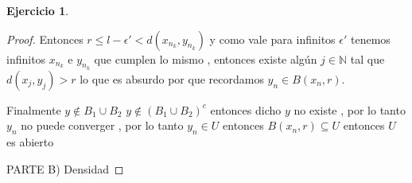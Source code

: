 \documentclass[12pt]{article}
\newcommand{\N}{\mathbb{N}}
\theoremstyle{definition}
\newtheorem{ej}{Ejercicio}
\begin{document}
\begin{ej}
\begin{proof}
	  Entonces $r \leq l - \epsilon ' < d(x_{n_k},y_{n_k})$ y como vale para infinitos $\epsilon '$ tenemos infinitos $x_{n_k}$ e $y_{n_k}$ que cumplen lo mismo , entonces existe algún $j \in \N$ tal que $d(x_j,y_j) > r$ lo que es absurdo por que recordamos $y_n \in B(x_n,r)$.

    Finalmente $y \notin B_1 \cup B_2 $ $y \notin (B_1 \cup B_2 )^c$ entonces dicho $y$ no existe , por lo tanto $y_n $ no puede converger , por lo tanto $y_n \in U$ entonces $B(x_n,r) \subseteq U$ entonces $U$ es abierto

  PARTE B) Densidad

  \end{proof}
\end{ej}
\end{document}
